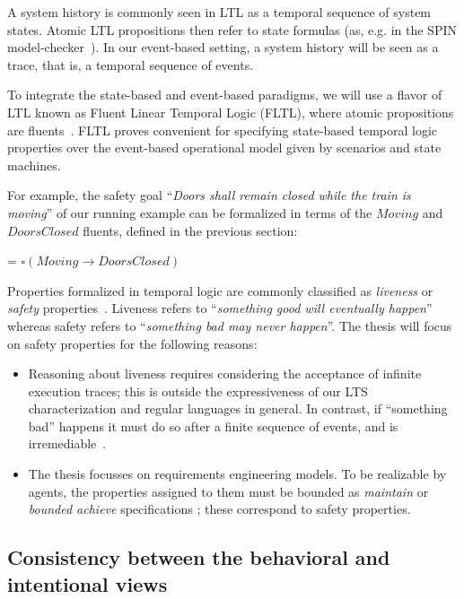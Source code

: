 A system history is commonly seen in LTL as a temporal sequence of system states. Atomic LTL propositions then refer to state formulas (as, e.g. in the SPIN model-checker~\cite{Holzmann:1997}). In our event-based setting, a system history will be seen as a trace, that is, a temporal sequence of events. 

To integrate the state-based and event-based paradigms, we will use a flavor of LTL known as Fluent Linear Temporal Logic (FLTL), where atomic propositions are fluents~\cite{Giannakopoulou:2003}. FLTL proves convenient for specifying state-based temporal logic properties over the event-based operational model given by scenarios and state machines. 

For example, the safety goal ``\emph{Doors shall remain closed while the train is moving}'' of our running example can be formalized in terms of the $Moving$ and $DoorsClosed$ fluents, defined in the previous section:
\begin{center}
 = $\square(Moving \rightarrow DoorsClosed)$
\end{center}

Properties formalized in temporal logic are commonly classified as \emph{liveness} or \emph{safety} properties~\cite{Alpern:1986}. Liveness refers to ``\emph{something good will eventually happen}'' whereas safety refers to  ``\emph{something bad may never happen}''. The thesis will focus on safety properties for the following reasons:
\begin{itemize}
\item Reasoning about liveness requires considering the acceptance of infinite execution traces; this is outside the expressiveness of our LTS characterization and regular languages in general. In contrast, if ``something bad'' happens it must do so after a finite sequence of events, and is irremediable~\cite{Alpern:1986, Giannakopoulou:1999}.
\item The thesis focusses on requirements engineering models. To be realizable by agents, the properties assigned to them must be bounded as \emph{maintain} or \emph{bounded achieve} specifications \cite{Letier:2002}; these correspond to safety properties.  
\end{itemize}

\subsection{Consistency between the behavioral and intentional views\label{subsection:background-goals-consistency}}

